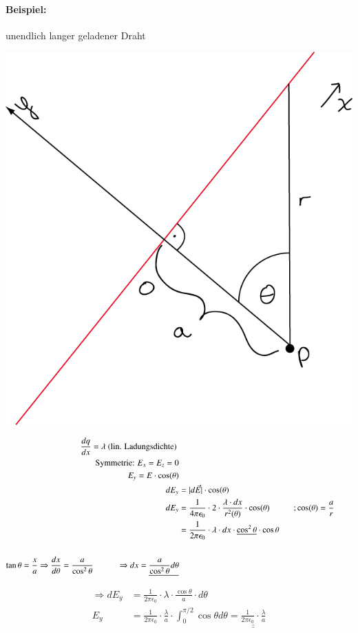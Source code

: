 \documentclass[11pt]{article}
\begin{document}
		\paragraph{Beispiel:} unendlich langer geladener Draht \\
		\begin{center}
			\includegraphics[width=0.5\linewidth]{skizzen/14/14_5B1}
		\end{center}
		\begin{align*}
		\frac{dq}{dx} = \lambda \text{ (lin. Ladungsdichte) } \\
		\text{Symmetrie: } E_x = E_z = 0 \\
		E_y = E \cdot \cos(\theta) \\
		dE_y& = | d\vec{E} | \cdot \cos (\theta) \\
		dE_y &= \frac{1}{4\pi\epsilon_0} \cdot 2 \cdot \frac{\lambda \cdot dx}{r^2 (\theta)} \cdot \cos (\theta) \hspace{1cm} ; \cos (\theta) = \frac{a}{r}&& \\
		&= \frac{1}{2\pi\epsilon_0} \cdot \lambda \cdot dx  \cdot \underline{\cos^2\theta} \cdot \cos\theta \\
		\hfill \\
		\tan\theta = \frac{x}{a} \Rightarrow \frac{dx}{d\theta} = \frac{a}{\cos^2\theta} \hspace{1cm} \Rightarrow dx = \underline{\frac{a}{\cos^2\theta} d\theta}
		\end{align*}
		
		\begin{align*}
		\Rightarrow dE_y &= \frac{1}{2\pi\epsilon_0} \cdot \lambda \cdot \frac{\cos\theta}{a} \cdot d\theta \\
		E_y &= \frac{1}{2\pi\epsilon_0} \cdot \frac{\lambda}{a} \cdot { \displaystyle\int_{0}^{\pi/2} \cos\theta d\theta } = \underline{\underline{\frac{1}{2\pi\epsilon_0} \cdot  \frac{\lambda}{a} }}
		\end{align*}
\end{document}
